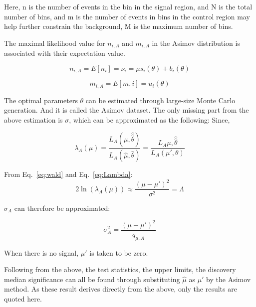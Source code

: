Here, n is the number of events in the bin in the signal region, and N is the total number of bins, and m is the number of events in bins in the control region may help further constrain the background, M is the maximum number of bins. 

The maximal likelihood value for $n_{i,A}$ and $m_{i,A}$ in the Asimov distribution is associated with their expectation value. 

\begin{equation}
    n_{i,A} = E[n_{i}] = \nu_{i} = \mu s_{i}(\theta) + b_{i}(\theta)
\end{equation}

\begin{equation}
    m_{i,A} = E[m,i] = u_{i}(\theta)
\end{equation}

The optimal parameters $\theta$ can be estimated through large-size Monte Carlo generation. And it is called the Asimov dataset.
The only missing part from the above estimation is $\sigma$, which can be approximated as the following: 
Since, 

\begin{equation}
    \lambda_{A}(\mu) = \frac{L_{A}(\mu, \hat{\hat{\theta}})}{L_{A}(\hat{\mu}, \hat{\theta})}
= \frac{L_{A}{\mu, \hat{\hat{\theta}}}}{L_{A}(\mu', \theta)}
\end{equation}


From Eq.~\ref{eq:wald} and Eq.~\ref{eq:Lambda}:
\begin{equation}
2\ln(\lambda_{A}(\mu)) \approx \frac{(\mu-\mu')^{2}}{\sigma^{2}}=\Lambda
\end{equation}

$\sigma_{A}$ can therefore be approximated:

\begin{equation}
    \sigma_{A}^{2} = \frac{(\mu-\mu')^{2}}{q_{\mu,A}}
\end{equation}

When there is no signal, $\mu'$ is taken to be zero. 

Following from the above, the test statistics, the upper limits, the discovery median significance can all be found through substituting $\hat{\mu}$ as $\mu'$ by the Asimov method. As these result derives directly from the above, only the results are quoted here. 

